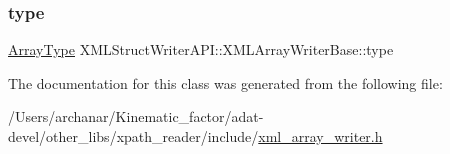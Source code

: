 \subsubsection{\texorpdfstring{type}{type}}
{\footnotesize\ttfamily \mbox{\hyperlink{namespaceXMLStructWriterAPI_a2017208be87c77a32bdc19ea2f14d032}{Array\+Type}} X\+M\+L\+Struct\+Writer\+A\+P\+I\+::\+X\+M\+L\+Array\+Writer\+Base\+::type\hspace{0.3cm}{\ttfamily [protected]}}



The documentation for this class was generated from the following file\+:\begin{DoxyCompactItemize}
\item 
/\+Users/archanar/\+Kinematic\+\_\+factor/adat-\/devel/other\+\_\+libs/xpath\+\_\+reader/include/\mbox{\hyperlink{adat-devel_2other__libs_2xpath__reader_2include_2xml__array__writer_8h}{xml\+\_\+array\+\_\+writer.\+h}}\end{DoxyCompactItemize}
